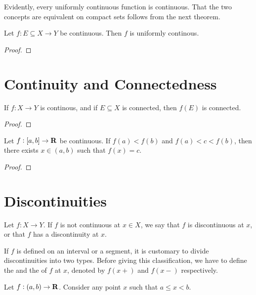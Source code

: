Evidently, every uniformly continuous function is continuous. That the two concepts are equivalent on compact sets follows from the next theorem. 

\begin{proposition}
Let $f:E\subseteq X\to Y$ be continuous. Then $f$ is uniformly continous.
\end{proposition}

\begin{proof}

\end{proof}

\section{Continuity and Connectedness}
\begin{proposition}
If $f:X\to Y$ is continous, and if $E\subseteq X$ is connected, then $f(E)$ is connected.
\end{proposition}

\begin{proof}

\end{proof}

\begin{theorem}
Let $f:[a,b]\to\mathbf R$ be continuous. If $f(a)<f(b)$ and $f(a)<c<f(b)$, then there exists $x\in(a,b)$ such that $f(x)=c$.
\end{theorem}

\begin{proof}

\end{proof}

\section{Discontinuities}
Let $f:X\to Y$. If $f$ is not continuous at $x\in X$, we say that $f$ is discontinuous at $x$, or that $f$ has a discontinuity at $x$.

If $f$ is defined on an interval or a segment, it is customary to divide discontinuities into two types. Before giving this classification, we have to define the  and the  of $f$ at $x$, denoted by $f(x+)$ and $f(x-)$ respectively.

\begin{definition}
Let $f:(a,b)\to\mathbf R$. Consider any point $x$ such that $a\le x<b$. 
\end{definition}

